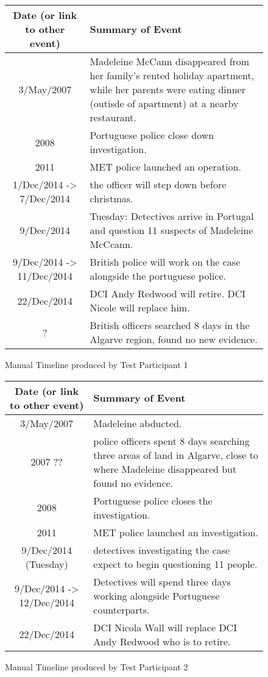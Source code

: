 \begin{figure}[H]
\begin{tabular}{|c|p{7cm}|}
\hline
Date (or link to other event) & Summary of Event\\
\hline
\hline
3/May/2007 &Madeleine McCann disappeared from her family's rented holiday apartment, while her parents were eating dinner (outisde of apartment) at a nearby restaurant.\\
\hline
2008 & Portuguese police close down investigation.\\
\hline
2011 & MET police launched an operation.\\
\hline
1/Dec/2014 -> 7/Dec/2014 & the officer will step down before christmas.\\
\hline
9/Dec/2014 & Tuesday: Detectives arrive in Portugal and question 11 suspects of Madeleine McCcann.\\
\hline
9/Dec/2014 -> 11/Dec/2014 & British police will work on the case alongside the portuguese police.\\
\hline
22/Dec/2014 & DCI Andy Redwood will retire. DCI Nicole will replace him.\\
\hline
? & British officers searched 8 days in the Algarve region, found no new evidence.\\
\hline
\end{tabular}
\caption{Manual Timeline produced by Test Participant 1}
\end{figure}

\begin{figure}[H]
\begin{tabular}{|c|p{7cm}|}
\hline
Date (or link to other event) & Summary of Event\\
\hline
\hline
3/May/2007 & Madeleine abducted.\\
\hline
2007 ?? &  police officers spent 8 days searching three areas of land in Algarve, close to where Madeleine disappeared but found no evidence.\\
\hline
2008 & Portuguese police closes the investigation.\\
\hline
2011 & MET police launched an investigation.\\
\hline
9/Dec/2014 (Tuesday) & detectives investigating the case expect to begin questioning 11 people.\\
\hline
9/Dec/2014 -> 12/Dec/2014 & Detectives will spend three days working alongside Portuguese counterparts.\\
\hline
22/Dec/2014 & DCI Nicola Wall will replace DCI Andy Redwood who is to retire.\\
\hline
\end{tabular}
\caption{Manual Timeline produced by Test Participant 2}
\end{figure}

